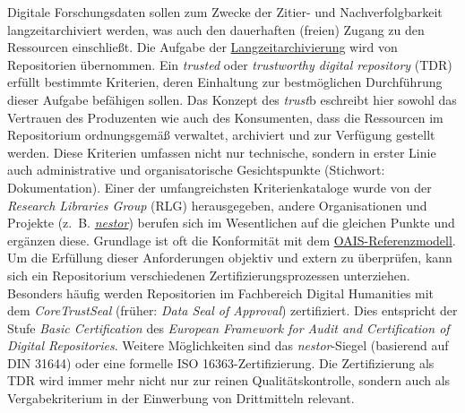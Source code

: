 \documentclass{article}
\begin{document}
    Digitale Forschungsdaten sollen zum Zwecke der Zitier- und Nachverfolgbarkeit langzeitarchiviert werden, was auch den dauerhaften (freien) Zugang zu den Ressourcen einschließt. Die Aufgabe der \href{http://gams.uni-graz.at/o:konde.6}{Langzeitarchivierung} wird von Repositorien übernommen. Ein \emph{trusted} oder \emph{trustworthy digital repository} (TDR) erfüllt bestimmte Kriterien, deren Einhaltung zur bestmöglichen Durchführung dieser Aufgabe befähigen sollen. Das Konzept des \emph{trust}b eschreibt hier sowohl das Vertrauen des Produzenten wie auch des Konsumenten, dass die Ressourcen im Repositorium ordnungsgemäß verwaltet, archiviert und zur Verfügung gestellt werden. Diese Kriterien umfassen nicht nur technische, sondern in erster Linie auch administrative und organisatorische Gesichtspunkte (Stichwort: Dokumentation). Einer der umfangreichsten Kriterienkataloge wurde von der \emph{Research Libraries Group} (RLG) herausgegeben, andere Organisationen und Projekte (z. B. \emph{\href{http://gams.uni-graz.at/o:konde.4}{nestor}}) berufen sich im Wesentlichen auf die gleichen Punkte und ergänzen diese. Grundlage ist oft die Konformität mit dem \href{http://gams.uni-graz.at/o:konde.11}{OAIS-Referenzmodell}. \\
            
        Um die Erfüllung dieser Anforderungen objektiv und extern zu überprüfen, kann sich ein Repositorium verschiedenen Zertifizierungsprozessen unterziehen. Besonders häufig werden Repositorien im Fachbereich Digital Humanities mit dem \emph{CoreTrustSeal }(früher: \emph{Data Seal of Approval}) zertifiziert. Dies entspricht der Stufe \emph{Basic Certification} des \emph{European Framework for Audit and Certification of Digital Repositories}. Weitere Möglichkeiten sind das \emph{nestor}-Siegel (basierend auf DIN 31644) oder eine formelle ISO 16363-Zertifizierung. Die Zertifizierung als TDR wird immer mehr nicht nur zur reinen Qualitätskontrolle, sondern auch als Vergabekriterium in der Einwerbung von Drittmitteln relevant.\\
            
\end{document}
